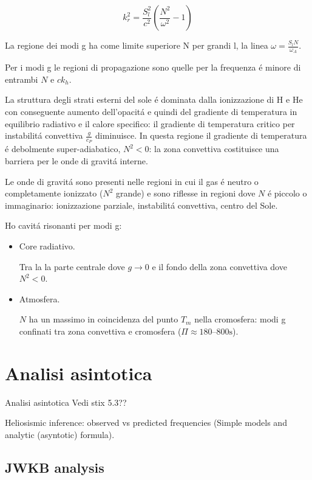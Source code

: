 \documentclass[oneside,12pt,fleqn]{memoir}
\begin{document}
\begin{equation*}
k_r^2=\frac{S_l^2}{c^2}(\frac{N^2}{\omega^2}-1)
\end{equation*}

La regione dei modi g ha come limite superiore N per grandi l, la linea $\omega=\frac{S_lN}{\omega_A}$.

Per i modi g le regioni di propagazione sono quelle per la frequenza \'e minore di entrambi $N$ e $ck_h$.

La struttura degli strati esterni del sole \'e dominata dalla ionizzazione di H e He con conseguente aumento dell'opacit\'a e quindi del gradiente di temperatura in equilibrio radiativo e il calore specifico: il gradiente di temperatura critico per instabilit\'a convettiva $\frac{g}{c_P}$ diminuisce. In questa regione il gradiente di temperatura \'e debolmente super-adiabatico, $N^2<0$: la zona convettiva costituisce una barriera per le onde di gravit\'a interne.

Le onde di gravit\'a sono presenti nelle regioni in cui il gas \'e neutro o completamente ionizzato ($N^2$ grande) e sono riflesse in regioni dove $N$ \'e piccolo o immaginario: ionizzazione parziale, instabilit\'a convettiva, centro del Sole.

Ho cavit\'a risonanti per modi g:
\begin{itemize}
    \item Core radiativo.
    
    Tra la la parte centrale dove $g\to0$ e il fondo della zona convettiva dove $N^2<0$.
    \item Atmosfera.
    
    $N$ ha un massimo in coincidenza del punto $T_m$ nella cromosfera: modi g confinati tra zona convettiva e cromosfera ($\Pi\approx\numrange{180}{800}\si{\second}$).
\end{itemize}


\section{Analisi asintotica}

\begin{todo}{Analisi asintotica}
Vedi stix 5.3??

Heliosismic inference: observed vs predicted frequencies (Simple models and analytic (asyntotic) formula).
\end{todo}

\subsection{JWKB analysis}
\end{document}
